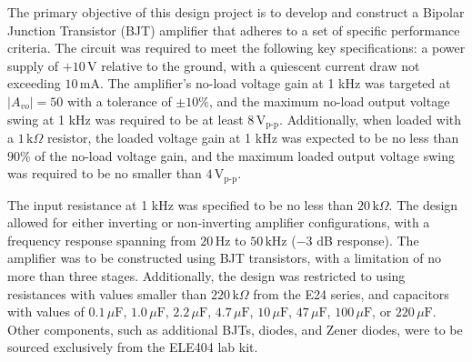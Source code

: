 {The primary objective of this design project is to develop and construct a Bipolar Junction Transistor (BJT) amplifier that adheres to a set of specific performance criteria. The circuit was required to meet the following key specifications: a power supply of \( +10 \, \text{V} \) relative to the ground, with a quiescent current draw not exceeding \( 10 \, \text{mA} \). The amplifier's no-load voltage gain at 1 kHz was targeted at \( |A_{vo}| = 50 \) with a tolerance of \( \pm 10\% \), and the maximum no-load output voltage swing at 1 kHz was required to be at least \( 8 \, \text{V}_{\text{p-p}} \). Additionally, when loaded with a \( 1 \, \text{k}\Omega \) resistor, the loaded voltage gain at 1 kHz was expected to be no less than \( 90\% \) of the no-load voltage gain, and the maximum loaded output voltage swing was required to be no smaller than \( 4 \, \text{V}_{\text{p-p}} \).}

{The input resistance at 1 kHz was specified to be no less than \( 20 \, \text{k}\Omega \). The design allowed for either inverting or non-inverting amplifier configurations, with a frequency response spanning from \( 20 \, \text{Hz} \) to \( 50 \, \text{kHz} \) (−3 dB response). The amplifier was to be constructed using BJT transistors, with a limitation of no more than three stages. Additionally, the design was restricted to using resistances with values smaller than \( 220 \, \text{k}\Omega \) from the E24 series, and capacitors with values of \( 0.1 \, \mu\text{F} \), \( 1.0 \, \mu\text{F} \), \( 2.2 \, \mu\text{F} \), \( 4.7 \, \mu\text{F} \), \( 10 \, \mu\text{F} \), \( 47 \, \mu\text{F} \), \( 100 \, \mu\text{F} \), or \( 220 \, \mu\text{F} \). Other components, such as additional BJTs, diodes, and Zener diodes, were to be sourced exclusively from the ELE404 lab kit.}

{}

{}

{}


